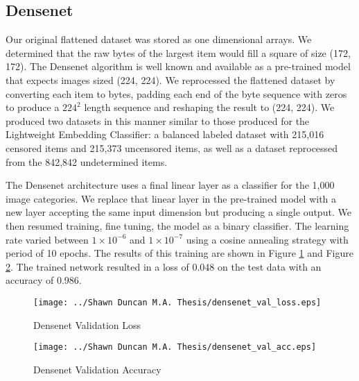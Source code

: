 \subsection{Densenet}\label{subsec:dense}
Our original flattened dataset was stored as one dimensional arrays.  We determined that the raw bytes of the largest item would fill a square of size (172, 172).  The Densenet algorithm is well known and available as a pre-trained model that expects images sized (224, 224). We reprocessed the flattened dataset by converting each item to bytes, padding each end of the byte sequence with zeros to produce a $224^2$ length sequence and reshaping the result to (224, 224). We produced two datasets in this manner similar to those produced for the Lightweight Embedding Classifier: a balanced labeled dataset with 215,016 censored items and 215,373 uncensored items, as well as a dataset reprocessed from the 842,842 undetermined items.

The Densenet architecture uses a final linear layer as a classifier for the 1,000 image categories.  We replace that linear layer in the pre-trained model with a new layer accepting the same input dimension but producing a single output.  We then resumed training, fine tuning, the model as a binary classifier. The learning rate varied between $1 \times 10^{-6}$ and $1 \times 10^{-7}$ using a cosine annealing strategy with period of 10 epochs. The results of this training are shown in Figure \ref{fig:dn_val_loss} and Figure \ref{fig:dn_val_acc}. The trained network resulted in a loss of 0.048 on the test data with an accuracy of 0.986.
\begin{figure}[hbt]
    \centering
    \texttt{[image: ../Shawn Duncan M.A. Thesis/densenet\_val\_loss.eps]}
    \caption{Densenet Validation Loss}
    \label{fig:dn_val_loss}
\end{figure}

\begin{figure}[hbt]
    \centering
    \texttt{[image: ../Shawn Duncan M.A. Thesis/densenet\_val\_acc.eps]}
    \caption{Densenet Validation Accuracy}
    \label{fig:dn_val_acc}
\end{figure}

